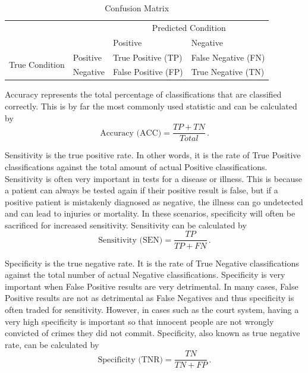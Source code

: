 \documentclass{article}
\begin{document}
\begin{table}[h!]
	\centering
	\begin{tabular}{llll}
		&                       & \multicolumn{2}{c}{Predicted Condition}                       \\ \cline{3-4} 
		& \multicolumn{1}{l|}{} & \multicolumn{1}{l|}{Positive} & \multicolumn{1}{l|}{Negative} \\ \cline{2-4} 
		\multicolumn{1}{c|}{\multirow{2}{*}{True Condition}} & \multicolumn{1}{l|}{Positive} & \multicolumn{1}{l|}{True Positive (TP)} & \multicolumn{1}{l|}{False Negative (FN)} \\ \cline{2-4} 
		\multicolumn{1}{c|}{}                                & \multicolumn{1}{l|}{Negative} & \multicolumn{1}{l|}{False Positive (FP)} & \multicolumn{1}{l|}{True Negative (TN)}  \\ \cline{2-4} 
	\end{tabular}
	\caption{Confusion Matrix}
	\label{tab:confusion_matrix}
\end{table}

Accuracy represents the total percentage of classifications that are classified correctly. This is by far the most commonly used statistic and can be calculated by
\begin{equation}
	\text{Accuracy (ACC)} = \frac{TP + TN}{Total} \,.
\end{equation}

Sensitivity is the true positive rate. In other words, it is the rate of True Positive classifications against the total amount of actual Positive classifications. Sensitivity is often very important in tests for a disease or illness. This is because a patient can always be tested again if their positive result is false, but if a positive patient is mistakenly diagnosed as negative, the illness can go undetected and can lead to injuries or mortality. In these scenarios, specificity will often be sacrificed for increased sensitivity. Sensitivity can be calculated by
\begin{equation}
	\text{Sensitivity (SEN)} = \frac{TP}{TP + FN} \, .
\end{equation}

Specificity is the true negative rate. It is the rate of True Negative classifications against the total number of actual Negative classifications. Specificity is very important when False Positive results are very detrimental. In many cases, False Positive results are not as detrimental as False Negatives and thus specificity is often traded for sensitivity. However, in cases such as the court system, having a very high specificity is important so that innocent people are not wrongly convicted of crimes they did not commit. Specificity, also known as true negative rate, can be calculated by
\begin{equation}
	\text{Specificity (TNR)} = \frac{TN}{TN + FP} \, .
\end{equation}
\end{document}
